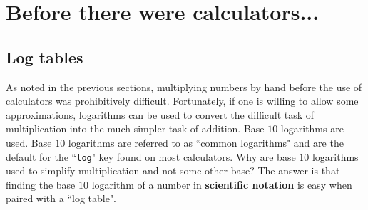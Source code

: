 \documentclass{article}
\begin{document}
\section*{Before there were calculators...}

\subsection*{Log tables}

As noted in the previous sections, multiplying numbers by hand before the use of calculators was prohibitively difficult. Fortunately, if one is willing to allow some approximations, logarithms can be used to convert the difficult task of multiplication into the much simpler task of addition. Base \(10\) logarithms are used. Base \(10\) logarithms are referred to as ``common logarithms" and are the default for the ``\texttt{log}" key found on most calculators. Why are base \(10\) logarithms used to simplify multiplication and not some other base? The answer is that finding the base \(10\) logarithm of a number in {\bf scientific notation} is easy when paired with a ``log table".
\end{document}

